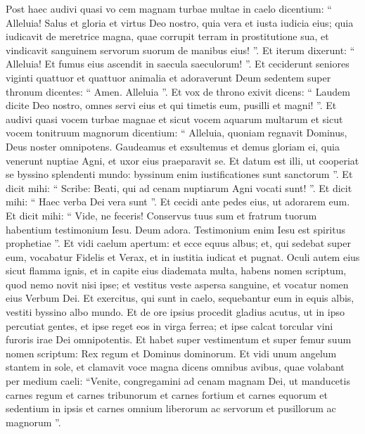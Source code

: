 \begin{biblechapter}
\begin{biblechapter}
\begin{biblechapter}
\begin{biblechapter}
\begin{biblechapter}
\begin{biblechapter}
\begin{biblechapter}
\begin{biblechapter}
\begin{biblechapter}
\begin{biblechapter}
\begin{biblechapter}
\begin{biblechapter}
\begin{biblechapter}
\begin{biblechapter}
\begin{biblechapter}
\begin{biblechapter}
\begin{biblechapter}
\begin{biblechapter}
\begin{biblechapter}
\verse Post haec audivi quasi vo cem magnam turbae multae in caelo dicentium:
 “ Alleluia!
 Salus et gloria et virtus Deo nostro, 
\verse quia vera et iusta iudicia eius;
 quia iudicavit de meretrice magna, quae corrupit terram in prostitutione sua, et vindicavit sanguinem servorum suorum de manibus eius! ”.
 \verse Et iterum dixerunt: “ Alleluia! Et fumus eius ascendit in saecula saeculorum! ”.
 \verse Et ceciderunt seniores viginti quattuor et quattuor animalia et adoraverunt Deum sedentem super thronum dicentes: “ Amen. Alleluia ”.
 \verse Et vox de throno exivit dicens:
 “ Laudem dicite Deo nostro, omnes servi eius
 et qui timetis eum, pusilli et magni! ”.
 \verse Et audivi quasi vocem turbae magnae et sicut vocem aquarum multarum et sicut vocem tonitruum magnorum dicentium:
 “ Alleluia,
 quoniam regnavit Dominus, Deus noster omnipotens.
 \verse Gaudeamus et exsultemus et demus gloriam ei,
 quia venerunt nuptiae Agni,
 et uxor eius praeparavit se.
 \verse Et datum est illi, ut cooperiat se byssino splendenti mundo: byssinum enim iustificationes sunt sanctorum ”.
 \verse Et dicit mihi: “ Scribe: Beati, qui ad cenam nuptiarum Agni vocati sunt! ”. Et dicit mihi: “ Haec verba Dei vera sunt ”. 
\verse Et cecidi ante pedes eius, ut adorarem eum. Et dicit mihi: “ Vide, ne feceris! Conservus tuus sum et fratrum tuorum habentium testimonium Iesu. Deum adora. Testimonium enim Iesu est spiritus prophetiae ”.
 \verse Et vidi caelum apertum: et ecce equus albus; et, qui sedebat super eum, vocabatur Fidelis et Verax, et in iustitia iudicat et pugnat.
 \verse Oculi autem eius sicut flamma ignis, et in capite eius diademata multa, habens nomen scriptum, quod nemo novit nisi ipse; 
\verse et vestitus veste aspersa sanguine, et vocatur nomen eius Verbum Dei. 
\verse Et exercitus, qui sunt in caelo, sequebantur eum in equis albis, vestiti byssino albo mundo. 
 \verse Et de ore ipsius procedit gladius acutus, ut in ipso percutiat gentes, et ipse reget eos in virga ferrea; et ipse calcat torcular vini furoris irae Dei omnipotentis. 
\verse Et habet super vestimentum et super femur suum nomen scriptum: Rex regum et Dominus dominorum.
 \verse Et vidi unum angelum stantem in sole, et clamavit voce magna dicens omnibus avibus, quae volabant per medium caeli: “Venite, congregamini ad cenam magnam Dei, 
\verse ut manducetis carnes regum et carnes tribunorum et carnes fortium et carnes equorum et sedentium in ipsis et carnes omnium liberorum ac servorum et pusillorum ac magnorum ”.

\end{biblechapter}
\end{biblechapter}
\end{biblechapter}
\end{biblechapter}
\end{biblechapter}
\end{biblechapter}
\end{biblechapter}
\end{biblechapter}
\end{biblechapter}
\end{biblechapter}
\end{biblechapter}
\end{biblechapter}
\end{biblechapter}
\end{biblechapter}
\end{biblechapter}
\end{biblechapter}
\end{biblechapter}
\end{biblechapter}
\end{biblechapter}
